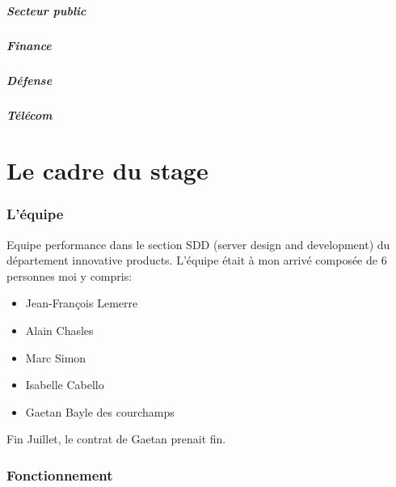 \documentclass[11pt]{article}
\begin{document}
			\subsubsection{Secteur public}
			\subsubsection{Finance}
			\subsubsection{Défense}
			\subsubsection{Télécom}

\newpage
{}
\part{Le cadre du stage}
	\section{L'équipe}
	Equipe performance dans le section SDD (server design and development) du département innovative products. L'équipe était 
	à mon arrivé composée de 6 personnes moi y compris:
	\begin{itemize}
	\item Jean-François Lemerre
	\item Alain Chasles
	\item Marc Simon
	\item Isabelle Cabello
	\item Gaetan Bayle des courchamps
	\end{itemize}
	Fin Juillet, le contrat de Gaetan prenait fin.
	\section{Fonctionnement}

\newpage
{}
\end{document}
